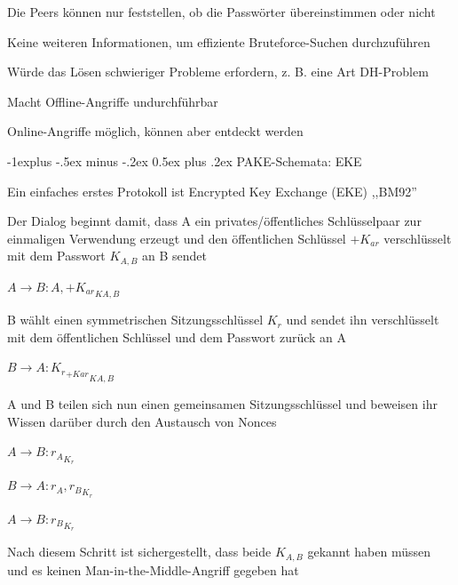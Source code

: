\documentclass[a4paper]{article}
\makeatletter
\renewcommand{\subsection}{\@startsection{subsection}{2}{0mm}%
 {-1explus -.5ex minus -.2ex}%
 {0.5ex plus .2ex}%
 {\normalfont\normalsize\bfseries}}
\makeatother
\begin{document}
\begin{multicols}{3}
\begin{itemize*}
\begin{itemize*}
                  \item Die Peers können nur feststellen, ob die Passwörter übereinstimmen oder nicht
                  \item Keine weiteren Informationen, um effiziente Bruteforce-Suchen durchzuführen
                  \begin{itemize*}
                        \item Würde das Lösen schwieriger Probleme erfordern, z. B. eine Art DH-Problem
                        \item Macht Offline-Angriffe undurchführbar
                  \end{itemize*}
                  \item Online-Angriffe möglich, können aber entdeckt werden
            \end{itemize*}
      \end{itemize*}

      \subsection{PAKE-Schemata: EKE}
      \begin{itemize*}
            \item Ein einfaches erstes Protokoll ist Encrypted Key Exchange (EKE) ,,BM92''
            \item Der Dialog beginnt damit, dass A ein privates/öffentliches Schlüsselpaar zur einmaligen Verwendung erzeugt und den öffentlichen Schlüssel $+K_{ar}$ verschlüsselt mit dem Passwort $K_{A,B}$ an B sendet
            \begin{enumerate*}
                  \item $A\rightarrow B:A,{+K_{ar}}_{{K}{A,B}}$
            \end{enumerate*}
            \item B wählt einen symmetrischen Sitzungsschlüssel $K_r$ und sendet ihn verschlüsselt mit dem öffentlichen Schlüssel und dem Passwort zurück an A
            \begin{enumerate*}
                  \item $B\rightarrow A:{{K_r}_{{+K}{ar}}}_{{K}{A,B}}$
            \end{enumerate*}
            \item A und B teilen sich nun einen gemeinsamen Sitzungsschlüssel und beweisen ihr Wissen darüber durch den Austausch von Nonces
            \begin{enumerate*}
                  \item $A\rightarrow B:{r_A}_{K_r}$
                  \item $B\rightarrow A:{r_A,r_B}_{K_r}$
                  \item $A\rightarrow B:{r_B}_{K_r}$
            \end{enumerate*}
            \item Nach diesem Schritt ist sichergestellt, dass beide $K_{A,B}$ gekannt haben müssen und es keinen Man-in-the-Middle-Angriff gegeben hat
      \end{itemize*}


\end{multicols}
\end{document}
